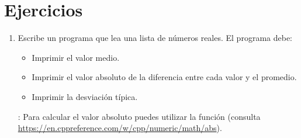 \section{Ejercicios}

\begin{enumerate}

\item Escribe un programa que lea una lista de números reales. El programa debe:
\begin{itemize}
  \item Imprimir el valor medio.
  \item Imprimir el valor absoluto de la diferencia entre cada valor y el promedio.
  \item Imprimir la desviación típica.
\end{itemize}

: Para calcular el valor absoluto puedes utilizar la función
 (consulta
\url{https://en.cppreference.com/w/cpp/numeric/math/abs}).

\end{enumerate}
